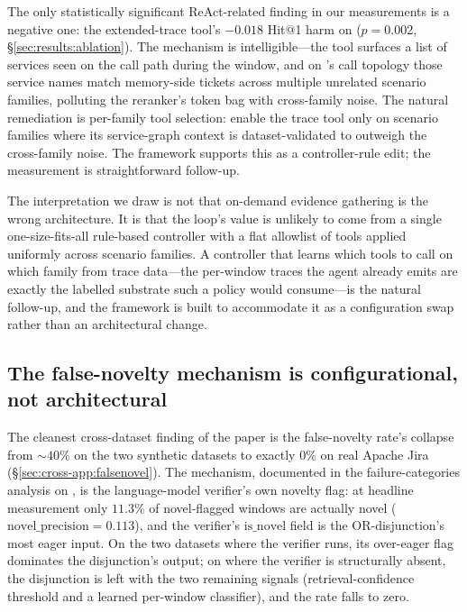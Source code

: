 The only statistically significant ReAct-related finding in our measurements is a negative one: the extended-trace tool's $-0.018$ Hit@1 harm on \dsob{} ($p = 0.002$, \S\ref{sec:results:ablation}). The mechanism is intelligible---the tool surfaces a list of services seen on the call path during the window, and on \dsob{}'s call topology those service names match memory-side tickets across multiple unrelated scenario families, polluting the reranker's token bag with cross-family noise. The natural remediation is per-family tool selection: enable the trace tool only on scenario families where its service-graph context is dataset-validated to outweigh the cross-family noise. The framework supports this as a controller-rule edit; the measurement is straightforward follow-up.

The interpretation we draw is not that on-demand evidence gathering is the wrong architecture. It is that the loop's value is unlikely to come from a single one-size-fits-all rule-based controller with a flat allowlist of tools applied uniformly across scenario families. A controller that learns which tools to call on which family from trace data---the per-window traces the agent already emits are exactly the labelled substrate such a policy would consume---is the natural follow-up, and the framework is built to accommodate it as a configuration swap rather than an architectural change.

\subsection{The false-novelty mechanism is configurational, not architectural}
\label{sec:discussion:falsenovel}

The cleanest cross-dataset finding of the paper is the false-novelty rate's collapse from $\sim$$40\%$ on the two synthetic datasets to exactly $0\%$ on real Apache Jira (\S\ref{sec:cross-app:falsenovel}). The mechanism, documented in the failure-categories analysis on \dsob{}, is the language-model verifier's own novelty flag: at headline measurement only $11.3\%$ of novel-flagged windows are actually novel ($\text{novel\_precision} = 0.113$), and the verifier's $\text{is\_novel}$ field is the OR-disjunction's most eager input. On the two datasets where the verifier runs, its over-eager flag dominates the disjunction's output; on \dswol{} where the verifier is structurally absent, the disjunction is left with the two remaining signals (retrieval-confidence threshold and a learned per-window classifier), and the rate falls to zero.


